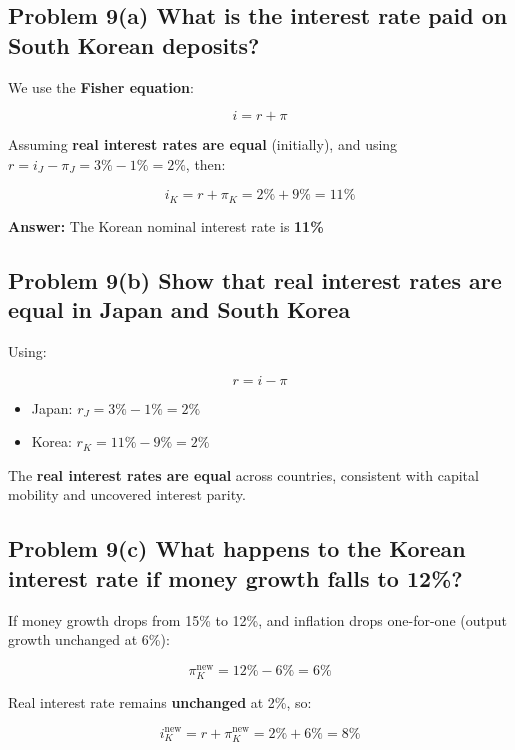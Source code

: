 \documentclass[
]{article}
\providecommand{\tightlist}{%
  \setlength{\itemsep}{0pt}\setlength{\parskip}{0pt}}
\begin{document}
\subsection{Problem 9(a) What is the interest rate paid on South Korean
deposits?}\label{problem-9a-what-is-the-interest-rate-paid-on-south-korean-deposits}

We use the \textbf{Fisher equation}:

\[
i = r + \pi
\]

Assuming \textbf{real interest rates are equal} (initially), and using
\(r = i_J - \pi_J = 3\% - 1\% = 2\%\), then:

\[
i_K = r + \pi_K = 2\% + 9\% = 11\%
\]

\textbf{Answer:} The Korean nominal interest rate is \textbf{11\%}

\subsection{Problem 9(b) Show that real interest rates are equal in
Japan and South
Korea}\label{problem-9b-show-that-real-interest-rates-are-equal-in-japan-and-south-korea}

Using:

\[
r = i - \pi
\]

\begin{itemize}
\tightlist
\item
  Japan: \(r_J = 3\% - 1\% = 2\%\)
\item
  Korea: \(r_K = 11\% - 9\% = 2\%\)
\end{itemize}

The \textbf{real interest rates are equal} across countries, consistent
with capital mobility and uncovered interest parity.

\subsection{Problem 9(c) What happens to the Korean interest rate if
money growth falls to
12\%?}\label{problem-9c-what-happens-to-the-korean-interest-rate-if-money-growth-falls-to-12}

If money growth drops from 15\% to 12\%, and inflation drops one-for-one
(output growth unchanged at 6\%):

\[
\pi_K^{\text{new}} = 12\% - 6\% = 6\%
\]

Real interest rate remains \textbf{unchanged} at 2\%, so:

\[
i_K^{\text{new}} = r + \pi_K^{\text{new}} = 2\% + 6\% = 8\%
\]
\end{document}

